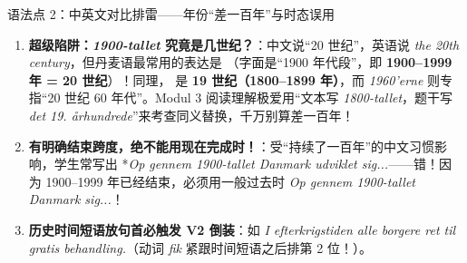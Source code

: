 \begin{grammatikbox}{语法点 2：中英文对比排雷——年份“差一百年”与时态误用}
\begin{enumerate}
  \item \textbf{超级陷阱：\textit{1900-tallet} 究竟是几世纪？}：中文说“20 世纪”，英语说 \textit{the 20th century}，但丹麦语最常用的表达是 （字面是“1900 年代段”，即 \textbf{1900--1999 年 = 20 世纪}）！同理， 是 \textbf{19 世纪（1800--1899 年）}，而 \textit{1960'erne} 则专指“20 世纪 60 年代”。Modul 3 阅读理解极爱用“文本写 \textit{1800-tallet}，题干写 \textit{det 19. århundrede}”来考查同义替换，千万别算差一百年！
  \item \textbf{有明确结束跨度，绝不能用现在完成时！}：受“持续了一百年”的中文习惯影响，学生常写出 *\textit{Op gennem 1900-tallet  Danmark udviklet sig...}——错！因为 1900--1999 年已经结束，必须用一般过去时 \textit{Op gennem 1900-tallet  Danmark sig...}！
  \item \textbf{历史时间短语放句首必触发 V2 倒装}：如 \textit{I efterkrigstiden  alle borgere ret til gratis behandling.}（动词 \textit{fik} 紧跟时间短语之后排第 2 位！）。
\end{enumerate}
\end{grammatikbox}


